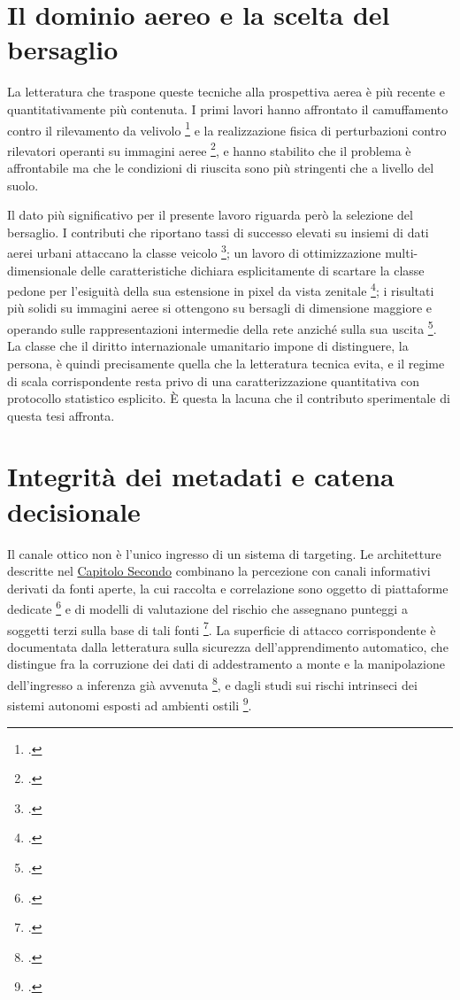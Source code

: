 \documentclass[a4paper,12pt]{report}
\begin{document}
\section{Il dominio aereo e la scelta del bersaglio}
\label{sec:sota_aereo}

La letteratura che traspone queste tecniche alla prospettiva aerea è più recente
e quantitativamente più contenuta. I primi lavori hanno affrontato il
camuffamento contro il rilevamento da velivolo \footcite{adhikari_2020} e la
realizzazione fisica di perturbazioni contro rilevatori operanti su immagini
aeree \footcite{du_2022}, e hanno stabilito che il problema è affrontabile ma che
le condizioni di riuscita sono più stringenti che a livello del suolo.

Il dato più significativo per il presente lavoro riguarda però la selezione del
bersaglio. I contributi che riportano tassi di successo elevati su insiemi di
dati aerei urbani attaccano la classe veicolo \footcite{shrestha_2023}; un lavoro
di ottimizzazione multi-dimensionale delle caratteristiche dichiara
esplicitamente di scartare la classe pedone per l'esiguità della sua estensione
in pixel da vista zenitale \footcite{xi_2025_lfrap}; i risultati più solidi su
immagini aeree si ottengono su bersagli di dimensione maggiore e operando sulle
rappresentazioni intermedie della rete anziché sulla sua uscita
\footcite{tang_2023}. La classe che il diritto internazionale umanitario impone
di distinguere, la persona, è quindi precisamente quella che la letteratura
tecnica evita, e il regime di scala corrispondente resta privo di una
caratterizzazione quantitativa con protocollo statistico esplicito. È questa la
lacuna che il contributo sperimentale di questa tesi affronta.

\section{Integrità dei metadati e catena decisionale}
\label{sec:sota_metadati}

Il canale ottico non è l'unico ingresso di un sistema di targeting. Le
architetture descritte nel \hyperref[cap2]{Capitolo Secondo} combinano la percezione con
canali informativi derivati da fonti aperte, la cui raccolta e correlazione sono
oggetto di piattaforme dedicate \footcite{gonzalez_2021_etip} e di modelli di
valutazione del rischio che assegnano punteggi a soggetti terzi sulla base di
tali fonti \footcite{asili_2025_gentprm}. La superficie di attacco corrispondente
è documentata dalla letteratura sulla sicurezza dell'apprendimento automatico,
che distingue fra la corruzione dei dati di addestramento a monte e la
manipolazione dell'ingresso a inferenza già avvenuta \footcite{cina_2023_poisoning},
e dagli studi sui rischi intrinseci dei sistemi autonomi esposti ad ambienti
ostili \footcite{podar_2025}.
\end{document}

